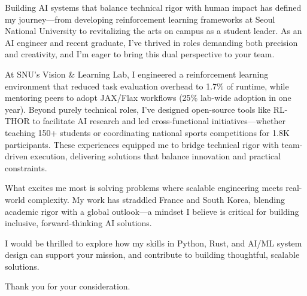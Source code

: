 
\newcommand{\Company}{}
\recipient{\phantom{.}}{}
\date{}
\makelettertitle{}

Building AI systems that balance technical rigor with human impact has defined my journey—from developing reinforcement learning frameworks at Seoul National University to revitalizing the arts on campus as a student leader. As an AI engineer and recent graduate, I've thrived in roles demanding both precision and creativity, and I'm eager to bring this dual perspective to your team.


At SNU's Vision \& Learning Lab, I engineered a reinforcement learning environment that reduced task evaluation overhead to 1.7\% of runtime, while mentoring peers to adopt JAX/Flax workflows (25\% lab-wide adoption in one year). Beyond purely technical roles, I've designed open-source tools like RL-THOR to facilitate AI research and led cross-functional initiatives—whether teaching 150+ students or coordinating national sports competitions for 1.8K participants. These experiences equipped me to bridge technical rigor with team-driven execution, delivering solutions that balance innovation and practical constraints.

What excites me most is solving problems where scalable engineering meets real-world complexity. My work has straddled France and South Korea, blending academic rigor with a global outlook—a mindset I believe is critical for building inclusive, forward-thinking AI solutions.

I would be thrilled to explore how my skills in Python, Rust, and AI/ML system design can support your mission, and contribute to building thoughtful, scalable solutions.

Thank you for your consideration.

\makeletterclosing
